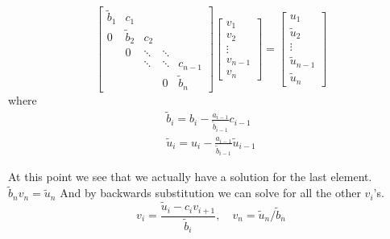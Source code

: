 \documentclass[10pt,a4paper]{article}
\begin{document}
    \[
    \begin{bmatrix}
    \tilde{b}_1 & c_1 &  &  &  \\
    0 & \tilde{b}_2 & c_2 &  &  \\
    & 0 & \ddots & \ddots &  \\
    &  & \ddots & \ddots & c_{n-1} \\
    &  &  & 0 & \tilde{b}_n
    \end{bmatrix}
    \begin{bmatrix}
        v_1 \\
        v_2 \\
        \vdots \\
        v_{n-1} \\
        v_n
    \end{bmatrix} =
    \begin{bmatrix}
        u_1 \\
        \tilde{u}_2 \\
        \vdots \\
        \tilde{u}_{n-1} \\
        \tilde{u}_n
    \end{bmatrix}
    \]
    where
    \begin{align}
    \tilde{b}_i = b_i - \tfrac{a_{i-1}}{\tilde{b}_{i-1}}c_{i-1}\\
    \tilde{u}_i = u_i - \tfrac{a_{i-1}}{\tilde{b}_{i-1}}\tilde{u}_{i-1}
    \end{align}

    At this point we see that we actually have a solution for the last element. $\tilde{b}_n v_n = \tilde{u}_n$ And by backwards substitution we can solve for all the other $v_i$'s.
    \begin{equation}
    v_i = \frac{\tilde{u}_i-c_iv_{i+1}}{\tilde{b}_i}, \quad v_n = \tilde{u}_n/\tilde{b}_n
    \end{equation}

	\newpage
\end{document}
